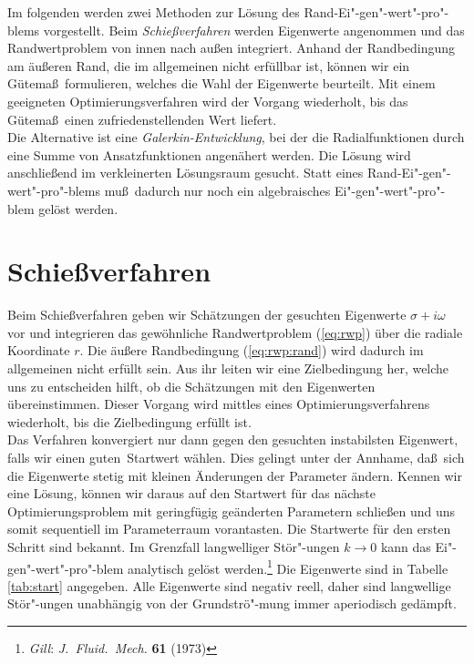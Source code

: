 \documentclass[10pt,a5paper,oneside,draft]{book}
\numberwithin{equation}{chapter}
\begin{document}
Im folgenden werden zwei Methoden zur L\"osung des Rand-Ei"-gen"-wert"-pro"-blems vorgestellt.
Beim \textit{Schie\ss verfahren} werden Eigenwerte angenommen und das Randwertproblem von innen nach au\ss en integriert.
Anhand der Randbedingung am \"au\ss eren Rand, die im allgemeinen nicht erf\"ullbar ist, k\"onnen wir ein G\"utema\ss\ formulieren, welches die Wahl der Eigenwerte beurteilt.
Mit einem geeigneten Optimierungsverfahren wird der Vorgang wiederholt, bis das G\"utema\ss\ einen zufriedenstellenden Wert liefert.\\
Die Alternative ist eine \textit{Galerkin-Entwicklung}, bei der die Radialfunktionen durch eine Summe von Ansatzfunktionen angen\"ahert werden.
Die L\"osung wird anschlie\ss end im verkleinerten L\"osungsraum gesucht.
Statt eines Rand-Ei"-gen"-wert"-pro"-blems mu\ss\ dadurch nur noch ein algebraisches Ei"-gen"-wert"-pro"-blem gel\"ost werden.
\newpage

\section{Schie\ss verfahren}\label{sec:schiessverfahren}
Beim Schie\ss verfahren geben wir Sch\"atzungen der gesuchten Eigenwerte $\sigma+i\omega$ vor und integrieren das gew\"ohnliche Randwertproblem (\mbox{\ref{eq:rwp}}) \"uber die radiale Koordinate $r$.
Die \"au\ss ere Randbedingung (\mbox{\ref{eq:rwp:rand}}) wird dadurch im allgemeinen nicht erf\"ullt sein.
Aus ihr leiten wir eine Zielbedingung her, welche uns zu entscheiden hilft, ob die Sch\"atzungen mit den Eigenwerten \"ubereinstimmen.
Dieser Vorgang wird mittles eines Optimierungsverfahrens wiederholt, bis die Zielbedingung erf\"ullt ist.\\

Das Verfahren konvergiert nur dann gegen den gesuchten instabilsten Eigenwert, falls wir einen \glqq guten\grqq\ Startwert w\"ahlen.
Dies gelingt unter der Annhame, da\ss\ sich die Eigenwerte stetig mit kleinen \"Anderungen der Parameter \"andern.
Kennen wir eine L\"osung, k\"onnen wir daraus auf den Startwert f\"ur das n\"achste Optimierungsproblem mit geringf\"ugig ge\"anderten Parametern schlie\ss en und uns somit sequentiell im Parameterraum vorantasten.
Die Startwerte f\"ur den ersten Schritt sind bekannt.
Im Grenzfall langwelliger St\"or"-ungen $k\to0$ kann das Ei"-gen"-wert"-pro"-blem analytisch gel\"ost werden.\footnote{\label{bib:gill2}\textsl{Gill}: \textit{J.\ Fluid.\ Mech.} \textbf{61} (1973)}
Die Eigenwerte sind in Tabelle \mbox{\ref{tab:start}} angegeben.
Alle Eigenwerte sind negativ reell, daher sind langwellige St\"or"-ungen unabh\"angig von der Grundstr\"o"-mung immer aperiodisch ged\"ampft.\\
\end{document}
